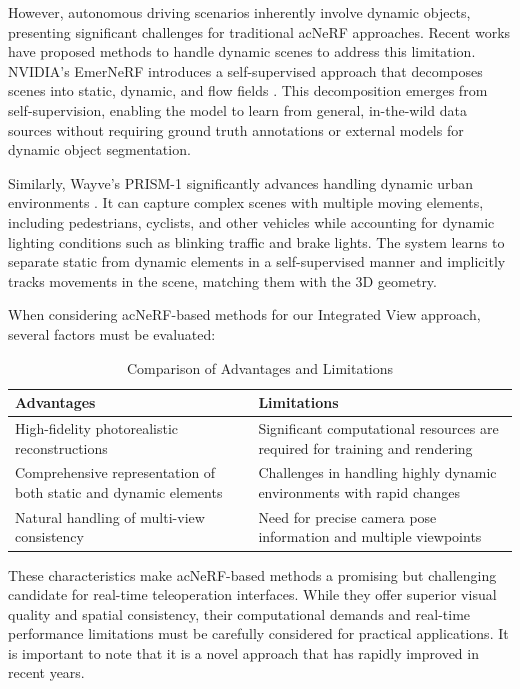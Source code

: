 However, autonomous driving scenarios inherently involve dynamic objects, presenting significant challenges for traditional ac{NeRF} approaches. Recent works have proposed methods to handle dynamic scenes to address this limitation. NVIDIA's EmerNeRF introduces a self-supervised approach that decomposes scenes into static, dynamic, and flow fields \cite{yang2023emernerf}. This decomposition emerges from self-supervision, enabling the model to learn from general, in-the-wild data sources without requiring ground truth annotations or external models for dynamic object segmentation.

Similarly, Wayve's PRISM-1 significantly advances handling dynamic urban environments \cite{prism2024wayve}. It can capture complex scenes with multiple moving elements, including pedestrians, cyclists, and other vehicles while accounting for dynamic lighting conditions such as blinking traffic and brake lights. The system learns to separate static from dynamic elements in a self-supervised manner and implicitly tracks movements in the scene, matching them with the 3D geometry.

When considering ac{NeRF}-based methods for our Integrated View approach, several factors must be evaluated:

\begin{table}[h!]
    \centering
    \begin{tabular}{|p{7cm}|p{7cm}|}
    \hline
    \textbf{Advantages} & \textbf{Limitations} \\ \hline
    High-fidelity photorealistic reconstructions & Significant computational resources are required for training and rendering \\ \hline
    Comprehensive representation of both static and dynamic elements & Challenges in handling highly dynamic environments with rapid changes \\ \hline
    Natural handling of multi-view consistency & Need for precise camera pose information and multiple viewpoints \\ \hline
    \end{tabular}
    \caption{Comparison of Advantages and Limitations}
    \label{table:advantages_limitations}
\end{table}

These characteristics make ac{NeRF}-based methods a promising but challenging candidate for real-time teleoperation interfaces. While they offer superior visual quality and spatial consistency, their computational demands and real-time performance limitations must be carefully considered for practical applications. It is important to note that it is a novel approach that has rapidly improved in recent years.

